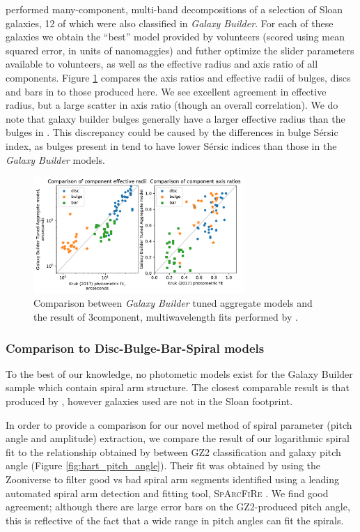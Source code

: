 \documentclass[../main.tex]{subfiles}
\begin{document}
\citet{Kruk2017:1710.00093v2} performed many-component, multi-band decompositions of a selection of Sloan galaxies, 12 of which were also classified in \textit{Galaxy Builder}. For each of these galaxies we obtain the ``best'' model provided by volunteers (scored using mean squared error, in units of nanomaggies) and futher optimize the slider parameters available to volunteers, as well as the effective radius and axis ratio of all components. Figure \ref{fig:sd_comp_comparison} compares the axis ratios and effective radii of bulges, discs and bars in \citet{Kruk2017:1710.00093v2} to those produced here. We see excellent agreement in effective radius, but a large scatter in axis ratio (though an overall correlation). We do note that galaxy builder bulges generally have a larger effective radius than the bulges in \citet{Kruk2017:1710.00093v2}. This discrepancy could be caused by the differences in bulge S\'ersic index, as bulges present in \citet{Kruk2017:1710.00093v2} tend to have lower S\'ersic indices than those in the \textit{Galaxy Builder} models.


\begin{figure}
  \includegraphics[width=8cm]{images__results/sd_comp_comparison.pdf}
  \caption{Comparison between \textit{Galaxy Builder} tuned aggregate models and the result of 3\-component, multi\-wavelength fits performed by \citet{Kruk2017:1710.00093v2}.}
  \label{fig:sd_comp_comparison}
\end{figure}


\subsubsection{Comparison to Disc-Bulge-Bar-Spiral models}
To the best of our knowledge, no photometic models exist for the Galaxy Builder sample which contain spiral arm structure. The closest comparable result is that produced by \citet{Gao2017:1709.00746v1}, however galaxies used are not in the Sloan footprint.

In order to provide a comparison for our novel method of spiral parameter (pitch angle and amplitude) extraction, we compare the result of our logarithmic spiral fit to the relationship obtained by \citet{Hart2016:1607.01019v1} between GZ2 classification and galaxy pitch angle (Figure \ref{fig:hart_pitch_angle}). Their fit was obtained by using the Zooniverse to filter good vs bad spiral arm segments identified using a leading automated spiral arm detection and fitting tool, \textsc{SpArcFiRe} \citep{Davis2014:1402.1910v1}. We find good agreement; although there are large error bars on the GZ2-produced pitch angle, this is reflective of the fact that a wide range in pitch angles can fit the spirals.
\end{document}

